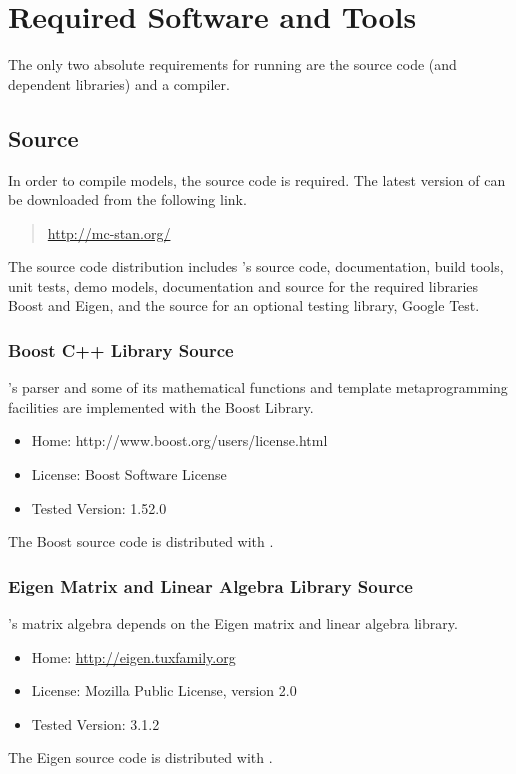 \section{Required Software and Tools}

The only two absolute requirements for running \Stan are the
\Stan source code (and dependent libraries) and a \Cpp compiler.

\subsection{\Stan Source}

In order to compile \Stan models, the \Stan source code is required.
The latest version of \Stan can be downloaded from the following link.
%
\begin{quote}
\url{http://mc-stan.org/}
\end{quote}
%
The \Stan source code distribution includes \Stan's source code,
documentation, build tools, unit tests, demo models, documentation and
source for the required libraries Boost and Eigen, and the source for
an optional testing library, Google Test.

\subsubsection{Boost C++ Library Source}

\Stan's parser and some of its mathematical functions and 
template metaprogramming facilities are implemented with the Boost
\Cpp Library.  
%
\begin{itemize}
\item Home: http://www.boost.org/users/license.html
\item License: Boost Software License
\item Tested Version: 1.52.0
\end{itemize}
%
The Boost source code is distributed with \Stan.


\subsubsection{Eigen Matrix and Linear Algebra Library Source}

\Stan's matrix algebra depends on the Eigen \Cpp matrix and linear
algebra library.  
%
\begin{itemize}
\item Home: \url{http://eigen.tuxfamily.org}
\item License: Mozilla Public License, version 2.0
\item Tested Version: 3.1.2
\end{itemize}
%
The Eigen source code is distributed with \Stan.


